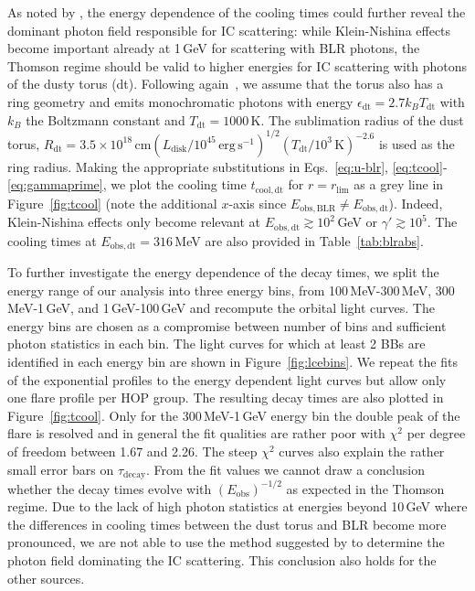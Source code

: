 \documentclass[twocolumn,linenumbers]{aastex62}
\begin{document}
  
As noted by \citet{2012ApJ...758L..15D}, the energy dependence of the cooling times could  further reveal the dominant photon field responsible for IC scattering: while Klein-Nishina effects become important already at 1\,GeV for scattering with BLR photons, the Thomson regime should be valid to higher energies for IC scattering with photons of the dusty torus (dt). 
Following again~\citet{finke2016}, we assume that the torus also has a ring geometry and emits monochromatic photons with energy $\epsilon_\mathrm{dt} = 2.7 k_B T_\mathrm{dt}$ with $k_B$ the Boltzmann constant and $T_\mathrm{dt} = 1000\,$K. 
The sublimation radius of the dust torus, $R_\mathrm{dt} = 3.5\times10^{18}\,\mathrm{cm}(L_\mathrm{disk}/10^{45}\,\mathrm{erg}\,\mathrm{s}^{-1})^{1/2}(T_\mathrm{dt}/10^3\,\mathrm{K})^{-2.6}$ is used as the ring radius. 
Making the appropriate substitutions in Eqs.~\ref{eq:u-blr}, \ref{eq:tcool}-\ref{eq:gammaprime}, we plot the cooling time $t_\mathrm{cool,dt}$ for $r = r_\mathrm{lim}$ as a grey line in Figure~\ref{fig:tcool} (note the additional $x$-axis since $E_\mathrm{obs, BLR} \neq E_\mathrm{obs,dt}$). 
Indeed, Klein-Nishina effects only become relevant at $E_\mathrm{obs,dt} \gtrsim 10^2\,$GeV or $\gamma' \gtrsim 10^5$. The cooling times at $E_\mathrm{obs,dt} = 316\,$MeV are also provided in Table~\ref{tab:blrabs}.

To further investigate the energy dependence of the decay times, we split the energy range of our analysis into three energy bins, 
 from 100\,MeV-300\,MeV, 300\,MeV-1\,GeV, and 1\,GeV-100\,GeV and recompute the orbital light curves.
The energy bins are chosen as a compromise between number of bins and sufficient photon statistics in each bin. 
The light curves for which at least 2 BBs are identified in each energy bin are shown in Figure~\ref{fig:lcebins}.
We repeat the fits of the exponential profiles to the energy dependent light curves but allow only one flare profile per HOP group. 
The resulting decay times are also plotted in Figure~\ref{fig:tcool}. %
Only for the 300\,MeV-1\,GeV energy bin the double peak of the flare is resolved and in general the fit qualities are rather poor with $\chi^2$ per degree of freedom between 1.67 and 2.26.
The steep $\chi^2$ curves also explain the rather small error bars on $\tau_\mathrm{decay}$. 
From the fit values we cannot draw a conclusion whether the decay times evolve with $(E_\mathrm{obs})^{-1/2}$ as expected in the Thomson regime.
Due to the lack of high photon statistics at energies beyond 10\,GeV where the differences in cooling times between the dust torus and BLR become more pronounced, we are not able to use the method suggested by \citet{2012ApJ...758L..15D} to determine the photon field dominating the IC scattering. 
This conclusion also holds for the other sources. 
\end{document}
